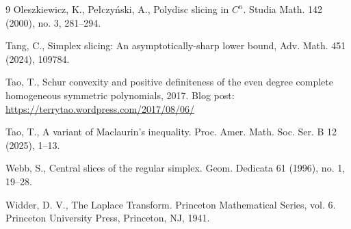 \documentclass[10pt]{article}
\newcommand{\1}{\textbf{1}}
\theoremstyle{remark}
\theoremstyle{definition}
\begin{document}
\begin{thebibliography}{9}
Oleszkiewicz, K., Pe\l czy\'nski, A.,
Polydisc slicing in $C^n$.
Studia Math. 142 (2000), no. 3, 281--294.




Tang, C., 
Simplex slicing: An asymptotically-sharp lower bound,
Adv. Math. 451 (2024), 109784.


Tao, T., Schur convexity and positive definiteness of the even degree complete homogeneous symmetric polynomials, 2017. Blog post: \url{https://terrytao.wordpress.com/2017/08/06/}


Tao, T.,
A variant of Maclaurin's inequality. 
Proc. Amer. Math. Soc. Ser. B 12 (2025), 1--13.




Webb, S., 
Central slices of the regular simplex. 
Geom. Dedicata 61 (1996), no. 1, 19--28.

 Widder, D. V., 
The Laplace Transform. Princeton Mathematical Series, vol. 6. Princeton University Press, Princeton, NJ, 1941.


\end{thebibliography}
\end{document}
